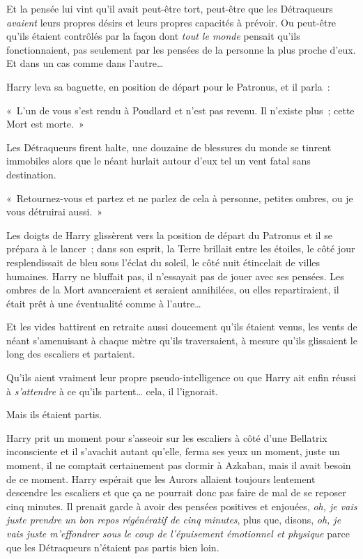 Et la pensée lui vint qu'il avait peut-être tort, peut-être que les Détraqueurs \emph{avaient} leurs propres désirs et leurs propres capacités à prévoir. Ou peut-être qu'ils étaient contrôlés par la façon dont \emph{tout le monde} pensait qu'ils fonctionnaient, pas seulement par les pensées de la personne la plus proche d'eux. Et dans un cas comme dans l'autre…

Harry leva sa baguette, en position de départ pour le Patronus, et il parla~:

«~L'un de vous s'est rendu à Poudlard et n'est pas revenu. Il n'existe plus~; cette Mort est morte.~»

Les Détraqueurs firent halte, une douzaine de blessures du monde se tinrent immobiles alors que le néant hurlait autour d'eux tel un vent fatal sans destination.

«~Retournez-vous et partez et ne parlez de cela à personne, petites ombres, ou je vous détruirai aussi.~»

Les doigts de Harry glissèrent vers la position de départ du Patronus et il se prépara à le lancer~; dans son esprit, la Terre brillait entre les étoiles, le côté jour resplendissait de bleu sous l'éclat du soleil, le côté nuit étincelait de villes humaines. Harry ne bluffait pas, il n'essayait pas de jouer avec ses pensées. Les ombres de la Mort avanceraient et seraient annihilées, ou elles repartiraient, il était prêt à une éventualité comme à l'autre…

Et les vides battirent en retraite aussi doucement qu'ils étaient venus, les vents de néant s'amenuisant à chaque mètre qu'ils traversaient, à mesure qu'ils glissaient le long des escaliers et partaient.

Qu'ils aient vraiment leur propre pseudo-intelligence ou que Harry ait enfin réussi à \emph{s'attendre} à ce qu'ils partent… cela, il l'ignorait.

Mais ils étaient partis.

Harry prit un moment pour s'asseoir sur les escaliers à côté d'une Bellatrix inconsciente et il s'avachit autant qu'elle, ferma ses yeux un moment, juste un moment, il ne comptait certainement pas dormir à Azkaban, mais il avait besoin de ce moment. Harry espérait que les Aurors allaient toujours lentement descendre les escaliers et que ça ne pourrait donc pas faire de mal de se reposer cinq minutes. Il prenait garde à avoir des pensées positives et enjouées, \emph{oh, je vais juste prendre un bon repos régénératif de cinq minutes}, plus que, disons, \emph{oh, je vais juste m'effondrer sous le coup de l'épuisement émotionnel et physique} parce que les Détraqueurs n'étaient pas partis bien loin.

